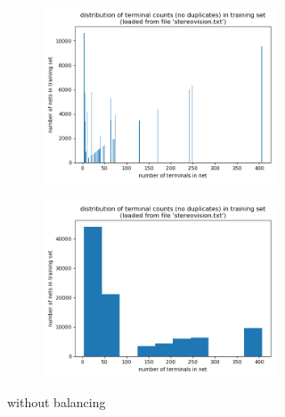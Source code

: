 \begin{figure}
	\centering
	\begin{subfigure}[b]{0.45\linewidth}
		\begin{subfigure}[b]{\linewidth}
			\includegraphics[width=\linewidth]{plots/data-distribution-full-fine.png}
		\end{subfigure}
		\begin{subfigure}[b]{\linewidth}
			\includegraphics[width=\linewidth]{plots/data-distribution-full-coarse.png}
		\end{subfigure}
		\caption{without balancing}
	\end{subfigure}
	\begin{subfigure}[b]{0.45\linewidth}
		\begin{subfigure}[b]{\linewidth}

\end{subfigure}
\end{subfigure}
\end{figure}
